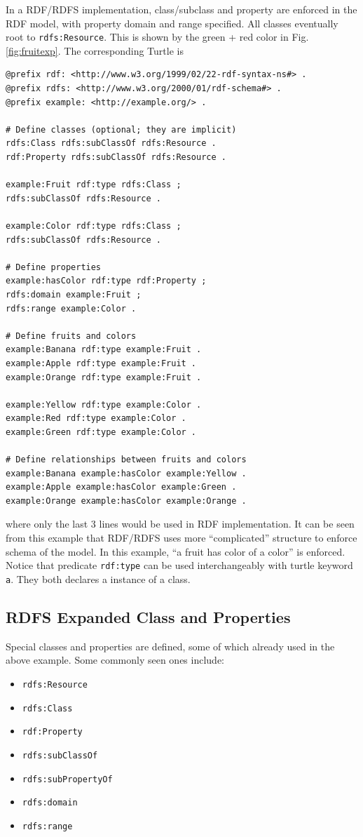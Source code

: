In a RDF/RDFS implementation, class/subclass and property are enforced in the RDF model, with property domain and range specified. All classes eventually root to \verb|rdfs:Resource|. This is shown by the green + red color in Fig. \ref{fig:fruitexp}. The corresponding Turtle is
\begin{lstlisting}
@prefix rdf: <http://www.w3.org/1999/02/22-rdf-syntax-ns#> .
@prefix rdfs: <http://www.w3.org/2000/01/rdf-schema#> .
@prefix example: <http://example.org/> .

# Define classes (optional; they are implicit)
rdfs:Class rdfs:subClassOf rdfs:Resource .
rdf:Property rdfs:subClassOf rdfs:Resource .

example:Fruit rdf:type rdfs:Class ;
rdfs:subClassOf rdfs:Resource .

example:Color rdf:type rdfs:Class ;
rdfs:subClassOf rdfs:Resource .

# Define properties
example:hasColor rdf:type rdf:Property ;
rdfs:domain example:Fruit ;
rdfs:range example:Color .

# Define fruits and colors
example:Banana rdf:type example:Fruit .
example:Apple rdf:type example:Fruit .
example:Orange rdf:type example:Fruit .

example:Yellow rdf:type example:Color .
example:Red rdf:type example:Color .
example:Green rdf:type example:Color .

# Define relationships between fruits and colors
example:Banana example:hasColor example:Yellow .
example:Apple example:hasColor example:Green .
example:Orange example:hasColor example:Orange .

\end{lstlisting} 
where only the last 3 lines would be used in RDF implementation. It can be seen from this example that RDF/RDFS uses more ``complicated'' structure to enforce schema of the model. In this example, ``a fruit has color of a color'' is enforced. Notice that predicate \verb|rdf:type| can be used interchangeably with turtle keyword \verb|a|. They both declares a instance of a class.

\subsection{RDFS Expanded Class and Properties}

Special classes and properties are defined, some of which already used in the above example. Some commonly seen ones include:
\begin{itemize}
	\item \verb|rdfs:Resource|
	\item \verb|rdfs:Class|
	\item \verb|rdf:Property|
	\item \verb|rdfs:subClassOf|
	\item \verb|rdfs:subPropertyOf|
	\item \verb|rdfs:domain|
	\item \verb|rdfs:range|
\end{itemize}

